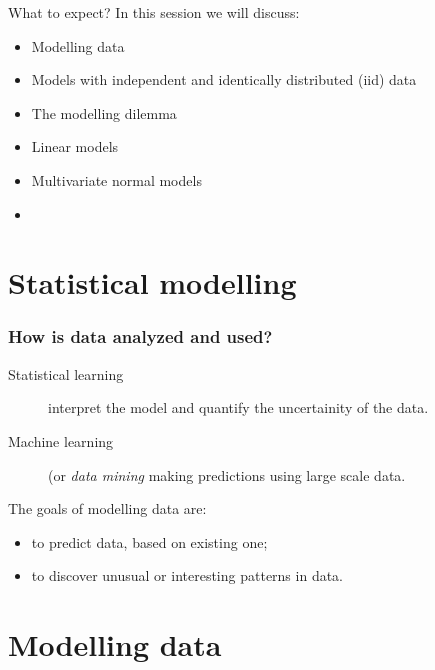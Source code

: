 \documentclass{beamer}
\begin{document}
\begin{frame}{What to expect?}
  In this session we will discuss:
  \begin{itemize}
    \item Modelling data
    \item Models with independent and identically distributed (iid) data
    \item The modelling dilemma
    \item Linear models
    \item Multivariate normal models
    \item 
  \end{itemize}
\end{frame}

\section{Statistical modelling}

\begin{frame}
\frametitle{How is data analyzed and used?}


\begin{description}
  \item [Statistical learning] interpret the model and quantify the uncertainity of the data.
  \item [Machine learning] (or {\em data mining} making predictions using large scale data.
\end{description}

The goals of modelling data are:
\begin{itemize}
  \item to predict data, based on existing one;
  \item to discover unusual or interesting patterns in data. 
\end{itemize}

\end{frame}

\section{Modelling data}
\end{document}
